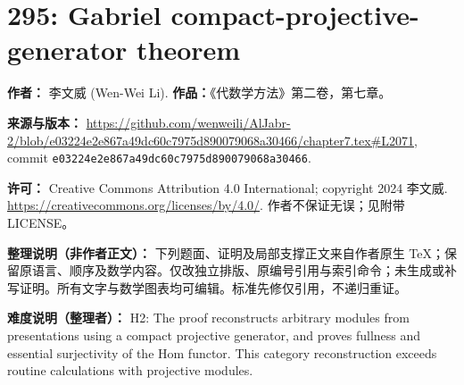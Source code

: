 \documentclass[11pt]{article}
\theoremstyle{definition}
\begin{document}
\section*{295: Gabriel compact-projective-generator theorem}
\noindent\textbf{作者：} 李文威 (Wen-Wei Li). \textbf{作品：}《代数学方法》第二卷，第七章。
\par\noindent\textbf{来源与版本：} \url{https://github.com/wenweili/AlJabr-2/blob/e03224e2e867a49dc60c7975d890079068a30466/chapter7.tex#L2071}, commit \texttt{e03224e2e867a49dc60c7975d890079068a30466}.
\par\noindent\textbf{许可：} Creative Commons Attribution 4.0 International; copyright 2024 李文威. \url{https://creativecommons.org/licenses/by/4.0/}. 作者不保证无误；见附带 LICENSE。
\par\noindent\textbf{整理说明（非作者正文）：} 下列题面、证明及局部支撑正文来自作者原生 TeX；保留原语言、顺序及数学内容。仅改独立排版、原编号引用与索引命令；未生成或补写证明。所有文字与数学图表均可编辑。标准先修仅引用，不递归重证。
\par\noindent\textbf{难度说明（整理者）：} H2: The proof reconstructs arbitrary modules from presentations using a compact projective generator, and proves fullness and essential surjectivity of the Hom functor. This category reconstruction exceeds routine calculations with projective modules.
\end{document}
